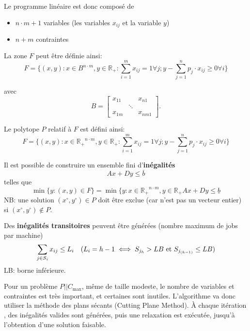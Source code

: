 \documentclass[a4paper,12pt]{report}
\theoremstyle{plain}				%
\theoremstyle{definition}				%
\newcommand\problemGrahamP{$P||C_{\max}$\xspace}
\newcommand{\lp}[1]{\todo[author=LP,color=yellow,inline]{#1}}
\begin{document}
Le programme linéaire est donc composé de
\begin{itemize}
\item $n \cdot m + 1$ variables (les variables $x_{ij}$ et la variable $y$)
\item $n+m$ contraintes
\end{itemize}

La zone $F$ peut être définie ainsi:
\[
  F=\{ (x,y) : x \in B^{n \cdot m}, y \in \mathbb{R_+} : \sum_{i=1}^{m} x_{ij}=1 \forall j;
y-\sum_{j=1}^{n} p_j \cdot x_{ij} \geq 0 \forall i \}
\]

avec
\[
B=\begin{bmatrix}
x_{11}& &x_{n1}\\
& \ddots & \\
x_{1m}& &x_{nm1}
\end{bmatrix}.
\]

Le polytope $P$ relatif à $F$ est défini ainsi:
\[
  F=\{ (x,y) : x \in \mathbb{R_+}^{n \cdot m}, y \in \mathbb{R_+} : \sum_{i=1}^{m} x_{ij}=1 \forall j;
  y-\sum_{j=1}^{n} p_j \cdot x_{ij} \geq 0 \forall i	\}
\]
\lp{Tu n'avais pas dit P?}

Il est possible de construire un ensemble fini d'\textbf{inégalités}
\[
  Ax+Dy \leq \overline{b}
\]
telles que
\[
  \min \{y : (x,y) \in F \} = \min \{y : x \in \mathbb{R_+}^{n \cdot m}, y \in \mathbb{R_+} Ax+Dy \leq \underline{b}
\]
NB: une solution
$(x \ensuremath{^\circ} , y\ensuremath{^\circ}) \in P$ doit être
exclue (car n'est pas un vecteur entier) si
$(x\ensuremath{^\circ}, y\ensuremath{^\circ}) \notin P $.

\bigskip

Des \textbf{inégalités transitoires} peuvent être générées (nombre
maximum de jobs par machine)
\[
  \sum_{j \in S_i} x_{ij} \leq L_i \quad (L_i = h-1 \iff S_{j_h} > LB
  \textnormal{ et } S_{j_{(h-1)}} \leq LB)
\]
LB: borne inférieure.

\bigskip

Pour un problème \problemGrahamP, même de taille modeste, le nombre de
variables et contraintes est très important, et certaines sont
inutiles.
L'algorithme va donc utiliser la méthode des plans sécants (Cutting
Plane Method).
\`A chaque itération , des inégalités valides sont générées, puis une
relaxation est exécutée, jusqu'à l'obtention d'une solution faisable.
\end{document}
